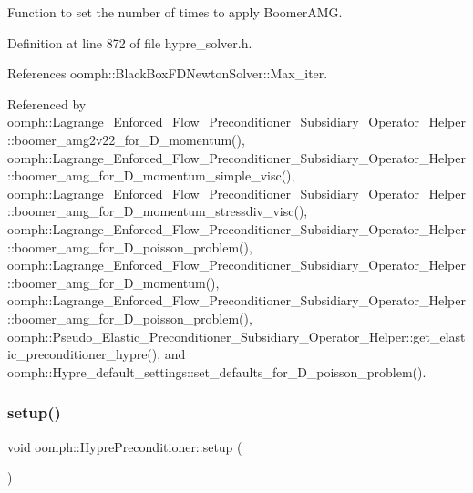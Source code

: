 Function to set the number of times to apply Boomer\+A\+MG. 



Definition at line 872 of file hypre\+\_\+solver.\+h.



References oomph\+::\+Black\+Box\+F\+D\+Newton\+Solver\+::\+Max\+\_\+iter.



Referenced by oomph\+::\+Lagrange\+\_\+\+Enforced\+\_\+\+Flow\+\_\+\+Preconditioner\+\_\+\+Subsidiary\+\_\+\+Operator\+\_\+\+Helper\+::boomer\+\_\+amg2v22\+\_\+for\+\_\+D\+\_\+momentum(), oomph\+::\+Lagrange\+\_\+\+Enforced\+\_\+\+Flow\+\_\+\+Preconditioner\+\_\+\+Subsidiary\+\_\+\+Operator\+\_\+\+Helper\+::boomer\+\_\+amg\+\_\+for\+\_\+D\+\_\+momentum\+\_\+simple\+\_\+visc(), oomph\+::\+Lagrange\+\_\+\+Enforced\+\_\+\+Flow\+\_\+\+Preconditioner\+\_\+\+Subsidiary\+\_\+\+Operator\+\_\+\+Helper\+::boomer\+\_\+amg\+\_\+for\+\_\+D\+\_\+momentum\+\_\+stressdiv\+\_\+visc(), oomph\+::\+Lagrange\+\_\+\+Enforced\+\_\+\+Flow\+\_\+\+Preconditioner\+\_\+\+Subsidiary\+\_\+\+Operator\+\_\+\+Helper\+::boomer\+\_\+amg\+\_\+for\+\_\+D\+\_\+poisson\+\_\+problem(), oomph\+::\+Lagrange\+\_\+\+Enforced\+\_\+\+Flow\+\_\+\+Preconditioner\+\_\+\+Subsidiary\+\_\+\+Operator\+\_\+\+Helper\+::boomer\+\_\+amg\+\_\+for\+\_\+D\+\_\+momentum(), oomph\+::\+Lagrange\+\_\+\+Enforced\+\_\+\+Flow\+\_\+\+Preconditioner\+\_\+\+Subsidiary\+\_\+\+Operator\+\_\+\+Helper\+::boomer\+\_\+amg\+\_\+for\+\_\+D\+\_\+poisson\+\_\+problem(), oomph\+::\+Pseudo\+\_\+\+Elastic\+\_\+\+Preconditioner\+\_\+\+Subsidiary\+\_\+\+Operator\+\_\+\+Helper\+::get\+\_\+elastic\+\_\+preconditioner\+\_\+hypre(), and oomph\+::\+Hypre\+\_\+default\+\_\+settings\+::set\+\_\+defaults\+\_\+for\+\_\+D\+\_\+poisson\+\_\+problem().

\mbox{\label{classoomph_1_1HyprePreconditioner_a5622db3b409cbdc49887aa65fa35215a}} 
\subsubsection{\texorpdfstring{setup()}{setup()}}
{\footnotesize\ttfamily void oomph\+::\+Hypre\+Preconditioner\+::setup (\begin{DoxyParamCaption}{ }\end{DoxyParamCaption})\hspace{0.3cm}{\ttfamily [virtual]}}



